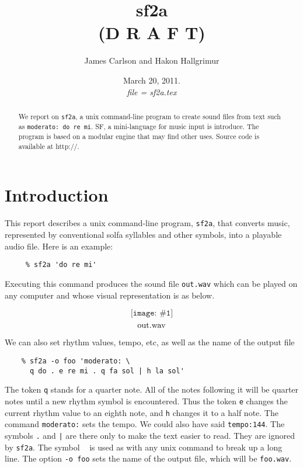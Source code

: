 \documentclass[11pt]{amsart}
\title{sf2a\\
(D R A F T) \\}
\author{James Carlson and Hakon Hallgrimur }
\date{March 20, 2011.\\ 
 \emph{file = sf2a.tex}}
\newcommand{\fig}[3]{  \[\texttt{[image: \#1]}\] \[\hbox{#3}\] }
\begin{document}
\maketitle





\begin{abstract}
We report on {\tt sf2a}, a unix command-line program to create sound files from text such as
{\tt moderato:\ do re mi}.  SF, a mini-language for music input is introduce.  The program is based 
on a modular engine that may find other uses.  Source code is available at http://.
\end{abstract}


\tableofcontents


\parskip=8pt
\parindent=0pt

\section{Introduction}


This report describes a unix command-line program,
{\tt sf2a}, that  converts music, represented by conventional solfa syllables
and other symbols, into a playable audio file.  Here is an example:
\begin{verbatim}
     % sf2a 'do re mi'
\end{verbatim}
Executing this command produces the sound file {\tt out.wav} which can be played
on any computer and whose visual representation is as below. 

\fig{ex1-wav2}{0.2}{out.wav}

We can also set rhythm values, tempo, etc, as well as the name of the output file
\begin{verbatim}
    % sf2a -o foo 'moderato: \
      q do . e re mi . q fa sol | h la sol'
\end{verbatim}
The token {\tt q} 
stands for a quarter note.  All of  the notes following it will be quarter
notes until a new rhythm symbol is encountered.  Thus the token {\tt e} changes
the current rhythm value to an eighth note, and {\tt h} changes it
to a half note.  The command {\tt moderato:} sets the tempo.
We could also have said {\tt tempo:144}. The symbols {\tt .} and {\tt |}
are there only to make the text easier to read.  They are ignored
by {\tt sf2a}.  The symbol {\tt \ } is used  as with any unix command to
break up a long line.  The option {\tt -o foo} sets the name of the output
file, which will be {\tt foo.wav}.
\end{document}
